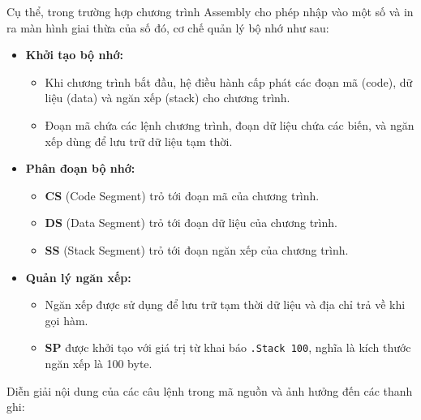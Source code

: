 \vspace{0.6cm}

\noindent\large 
Cụ thể, trong trường hợp chương trình Assembly cho phép nhập vào một số và in ra màn hình giai thừa của số đó, cơ chế quản lý bộ nhớ như sau:

\vspace{0.5cm}

\begin{itemize}
    \item \textbf{Khởi tạo bộ nhớ:}
    \begin{itemize}
        \item Khi chương trình bắt đầu, hệ điều hành cấp phát các đoạn mã (code), dữ liệu (data) và ngăn xếp (stack) cho chương trình.
        \item Đoạn mã chứa các lệnh chương trình, đoạn dữ liệu chứa các biến, và ngăn xếp dùng để lưu trữ dữ liệu tạm thời.
    \end{itemize}

    \item \textbf{Phân đoạn bộ nhớ:}
    \begin{itemize}
        \item \textbf{CS} (Code Segment) trỏ tới đoạn mã của chương trình.
        \item \textbf{DS} (Data Segment) trỏ tới đoạn dữ liệu của chương trình.
        \item \textbf{SS} (Stack Segment) trỏ tới đoạn ngăn xếp của chương trình.
    \end{itemize}

    \item \textbf{Quản lý ngăn xếp:}
    \begin{itemize}
        \item Ngăn xếp được sử dụng để lưu trữ tạm thời dữ liệu và địa chỉ trả về khi gọi hàm.
        \item \textbf{SP} được khởi tạo với giá trị từ khai báo \texttt{.Stack 100}, nghĩa là kích thước ngăn xếp là 100 byte.
    \end{itemize}
\end{itemize}

\vspace{0.6cm}

\noindent\large 
Diễn giải nội dung của các câu lệnh trong mã nguồn và ảnh hưởng đến các thanh ghi:

\vspace{0.5cm}

